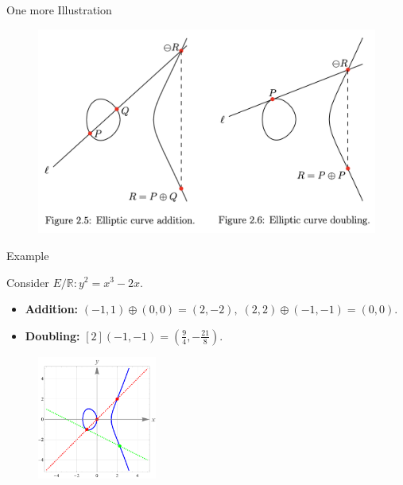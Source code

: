 \documentclass{zkdl-presentation-template}
\begin{document}
    \begin{frame}{One more Illustration}
        \begin{figure}[H]
            \centering
            \includegraphics[width=\textwidth]{images/lecture_3/group_law.png}
            \label{fig:group_law}
        \end{figure}
    \end{frame}

    \begin{frame}{Example}
        \begin{example}
        Consider $E/\mathbb{R}: y^2=x^3-2x$. 
        \begin{itemize}
            \item \textbf{Addition:} $(-1,1) \oplus (0,0) = (2,-2), \; (2,2) \oplus (-1,-1) = (0,0)$.
            \item \textbf{Doubling:} $[2](-1,-1) = \left(\frac{9}{4},-\frac{21}{8}\right)$.
        \end{itemize}
        \begin{figure}
            \centering
            \includegraphics[width=0.35\textwidth]{images/lecture_3/ec_illustration_6.pdf}
            \label{fig:ec_6}
        \end{figure}
        \end{example}
    \end{frame}
\end{document}
